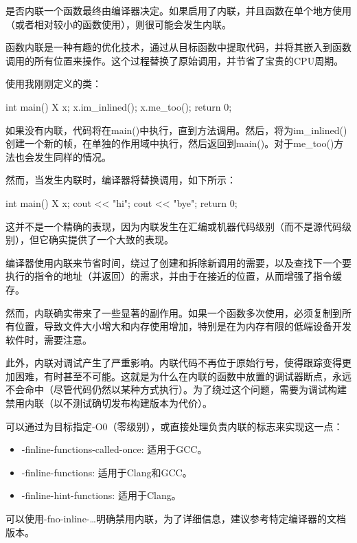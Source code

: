是否内联一个函数最终由编译器决定。如果启用了内联，并且函数在单个地方使用（或者相对较小的函数使用），则很可能会发生内联。

函数内联是一种有趣的优化技术，通过从目标函数中提取代码，并将其嵌入到函数调用的所有位置来操作。这个过程替换了原始调用，并节省了宝贵的CPU周期。

使用我刚刚定义的类：

\begin{cpp}
int main() {
    X x;
    x.im_inlined();
    x.me_too();
    return 0;
}
\end{cpp}

如果没有内联，代码将在main()中执行，直到方法调用。然后，将为im\_inlined()创建一个新的帧，在单独的作用域中执行，然后返回到main()。对于me\_too()方法也会发生同样的情况。

然而，当发生内联时，编译器将替换调用，如下所示：

\begin{cpp}
int main() {
    X x;
    cout << "hi\n";
    cout << "bye\n";
    return 0;
}
\end{cpp}

这并不是一个精确的表现，因为内联发生在汇编或机器代码级别（而不是源代码级别），但它确实提供了一个大致的表现。

编译器使用内联来节省时间，绕过了创建和拆除新调用的需要，以及查找下一个要执行的指令的地址（并返回）的需求，并由于在接近的位置，从而增强了指令缓存。

然而，内联确实带来了一些显著的副作用。如果一个函数多次使用，必须复制到所有位置，导致文件大小增大和内存使用增加，特别是在为内存有限的低端设备开发软件时，需要注意。

此外，内联对调试产生了严重影响。内联代码不再位于原始行号，使得跟踪变得更加困难，有时甚至不可能。这就是为什么在内联的函数中放置的调试器断点，永远不会命中（尽管代码仍然以某种方式执行）。为了绕过这个问题，需要为调试构建禁用内联（以不测试确切发布构建版本为代价）。

可以通过为目标指定-O0（零级别），或直接处理负责内联的标志来实现这一点：

\begin{itemize}
\item
-finline-functions-called-once: 适用于GCC。

\item
-finline-functions: 适用于Clang和GCC。

\item
-finline-hint-functions: 适用于Clang。
\end{itemize}

可以使用-fno-inline-…明确禁用内联，为了详细信息，建议参考特定编译器的文档版本。


